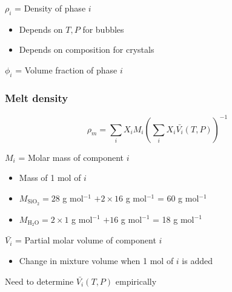 \documentclass{beamer}
\begin{document}
\begin{frame}
  \vspace{0.25cm}
  
  $\rho_{i}$ = Density of phase $i$ \\
  \begin{itemize}
  \item Depends on $T, P$ for bubbles \\
  \item Depends on composition for crystals \\
  \end{itemize}

  \vspace{0.25cm}
  
  $\phi_{i}$ = Volume fraction of phase $i$ \\
    
  
\end{frame}

\begin{frame}
  \frametitle{Melt density}

  $$\rho_{m} = \sum_{i} X_{i} M_{i} \left(\sum_{i} X_{i} \bar{V_{i}}(T, P)\right)^{-1}$$

  $M_{i}$ = Molar mass of component $i$\\
  \begin{itemize}
  \item Mass of 1 mol of $i$ \\
  \item $M_{\text{SiO}_{2}} = 28$ g mol$^{-1}$ $+ 2 \times 16$ g mol$^{-1}$ = 60 g mol$^{-1}$\\
  \item $M_{\text{H}_{2}\text{O}} = 2 \times 1$ g mol$^{-1}$ $+ 16$ g mol$^{-1}$ = 18 g mol$^{-1}$\\
  \end{itemize}

  $\bar{V_{i}}$ = Partial molar volume of component $i$ \\
  \begin{itemize}
    \item Change in mixture volume when 1 mol of $i$ is added \\
  \end{itemize}

  Need to determine $\bar{V_{i}}(T, P)$ empirically \\
\end{frame}
\end{document}
